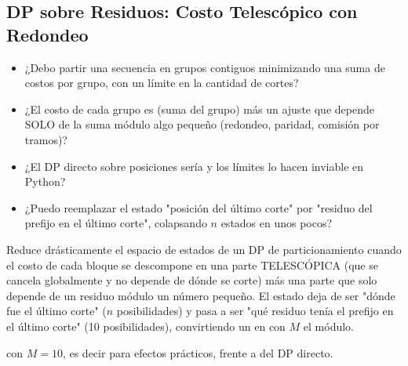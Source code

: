 \subsection{DP sobre Residuos: Costo Telescópico con Redondeo}


\begin{itemize}
\item ¿Debo partir una secuencia en grupos contiguos minimizando una suma de costos por grupo, con un límite en la cantidad de cortes?
\item ¿El costo de cada grupo es (suma del grupo) más un ajuste que depende SOLO de la suma módulo algo pequeño (redondeo, paridad, comisión por tramos)?
\item ¿El DP directo sobre posiciones sería  y los límites lo hacen inviable en Python?
\item ¿Puedo reemplazar el estado "posición del último corte" por "residuo del prefijo en el último corte", colapsando $n$ estados en unos pocos?
\end{itemize}

 Reduce drásticamente el espacio de estados de un DP de particionamiento cuando el costo de cada bloque se descompone en una parte TELESCÓPICA (que se cancela globalmente y no depende de dónde se corte) más una parte que solo depende de un residuo módulo un número pequeño. El estado deja de ser "dónde fue el último corte" ($n$ posibilidades) y pasa a ser "qué residuo tenía el prefijo en el último corte" (10 posibilidades), convirtiendo un  en  con $M$ el módulo.

  con $M = 10$, es decir  para efectos prácticos, frente a  del DP directo.

